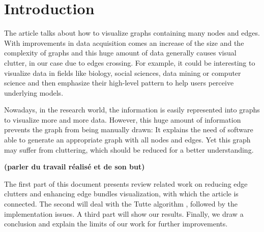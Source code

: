 \chapter*{Introduction}

The article talks about how to visualize graphs containing many nodes and edges. With improvements in data acquisition comes an increase of the size and the complexity of graphs and this huge amount of data generally causes visual clutter, in our case due to edges crossing.
For example, it could be interesting to visualize data in fields like biology, social sciences, data mining or computer science and then emphasize their high-level pattern to help users perceive underlying models.


Nowadays, in the research world, the information is easily represented into graphs to visualize more and more data. However, this huge amount of information prevents the graph from being manually drawn:  It explains the need of software able to generate an appropriate graph with all nodes and edges. Yet this graph may suffer from cluttering, which should be reduced for a better understanding.

\textbf{(parler du travail réalisé et de son but)}


The first part of this document presents review related work on reducing edge clutters and enhancing edge bundles visualization, with which the article is connected. The second will deal with the Tutte algorithm , followed by the implementation issues. A third part will show our results. Finally, we draw a conclusion and explain the limits of our work for further improvements.
